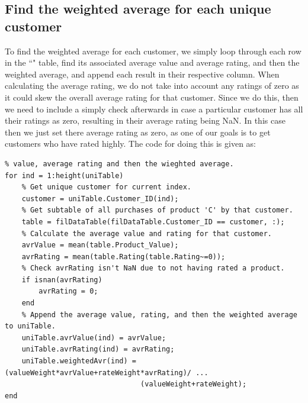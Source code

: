 \documentclass[12pt]{article}
\newcommand{\hl}[1]{``\path{#1}"}
\begin{document}
\subsection{Find the weighted average for each unique customer}
To find the weighted average for each customer, we simply loop through each row in the \hl{uniTable} table, find its associated average value and average rating, and then the weighted average, and append each result in their respective column. When calculating the average rating, we do not take into account any ratings of zero as it could skew the overall average rating for that customer. Since we do this, then we need to include a simply check afterwards in case a particular customer has all their ratings as zero, resulting in their average rating being NaN. In this case then we just set there average rating as zero, as one of our goals is to get customers who have rated highly. The code for doing this is given as:
\begin{lstlisting}[title={Find the weighted average}]
% Loop through each customer in uniTable, and find there average product
% value, average rating and then the wieghted average.
for ind = 1:height(uniTable)
    % Get unique customer for current index.
    customer = uniTable.Customer_ID(ind);
    % Get subtable of all purchases of product 'C' by that customer.
    table = filDataTable(filDataTable.Customer_ID == customer, :);
    % Calculate the average value and rating for that customer.
    avrValue = mean(table.Product_Value);
    avrRating = mean(table.Rating(table.Rating~=0));
    % Check avrRating isn't NaN due to not having rated a product.
    if isnan(avrRating)
        avrRating = 0;
    end
    % Append the average value, rating, and then the weighted average to uniTable.
    uniTable.avrValue(ind) = avrValue;
    uniTable.avrRating(ind) = avrRating;
    uniTable.weightedAvr(ind) = (valueWeight*avrValue+rateWeight*avrRating)/ ...
                                (valueWeight+rateWeight);
end
\end{lstlisting}
\end{document}
